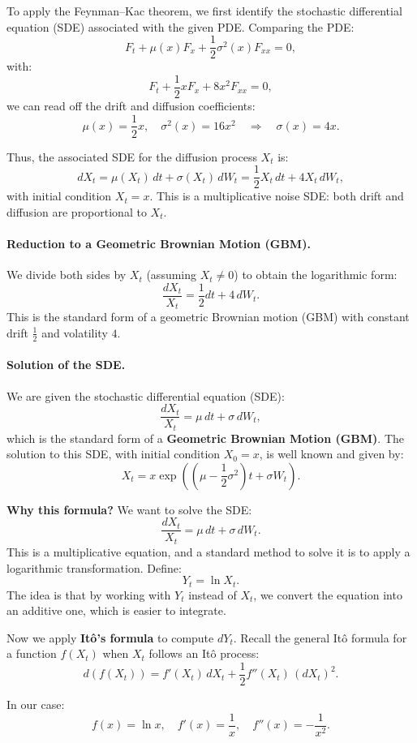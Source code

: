 To apply the Feynman–Kac theorem, we first identify the stochastic differential equation (SDE) associated with the given PDE. Comparing the PDE:
\[
F_t + \mu(x) F_x + \frac{1}{2} \sigma^2(x) F_{xx} = 0,
\]
with:
\[
F_t + \frac{1}{2}x F_x + 8x^2 F_{xx} = 0,
\]
we can read off the drift and diffusion coefficients:
\[
\mu(x) = \frac{1}{2}x, \quad \sigma^2(x) = 16x^2 \quad \Rightarrow \quad \sigma(x) = 4x.
\]

Thus, the associated SDE for the diffusion process \( X_t \) is:
\[
dX_t = \mu(X_t)\,dt + \sigma(X_t)\,dW_t = \frac{1}{2}X_t\,dt + 4X_t\,dW_t,
\]
with initial condition \( X_t = x \). This is a multiplicative noise SDE: both drift and diffusion are proportional to \( X_t \).

\paragraph{Reduction to a Geometric Brownian Motion (GBM).}  
We divide both sides by \( X_t \) (assuming \( X_t \neq 0 \)) to obtain the logarithmic form:
\[
\frac{dX_t}{X_t} = \frac{1}{2}dt + 4\,dW_t.
\]
This is the standard form of a geometric Brownian motion (GBM) with constant drift \( \frac{1}{2} \) and volatility \( 4 \).

\paragraph{Solution of the SDE.}  
We are given the stochastic differential equation (SDE):
\[
\frac{dX_t}{X_t} = \mu\,dt + \sigma\,dW_t,
\]
which is the standard form of a \textbf{Geometric Brownian Motion (GBM)}. The solution to this SDE, with initial condition \( X_0 = x \), is well known and given by:
\[
X_t = x \exp\left( \left( \mu - \frac{1}{2} \sigma^2 \right)t + \sigma W_t \right).
\]

\textbf{Why this formula?}  
We want to solve the SDE:
\[
\frac{dX_t}{X_t} = \mu\,dt + \sigma\,dW_t.
\]
This is a multiplicative equation, and a standard method to solve it is to apply a logarithmic transformation. Define:
\[
Y_t = \ln X_t.
\]
The idea is that by working with \( Y_t \) instead of \( X_t \), we convert the equation into an additive one, which is easier to integrate.

Now we apply \textbf{Itô's formula} to compute \( dY_t \). Recall the general Itô formula for a function \( f(X_t) \) when \( X_t \) follows an Itô process:
\[
d(f(X_t)) = f'(X_t)\,dX_t + \frac{1}{2} f''(X_t)\, (dX_t)^2.
\]

In our case:
\[
f(x) = \ln x, \quad f'(x) = \frac{1}{x}, \quad f''(x) = -\frac{1}{x^2}.
\]

